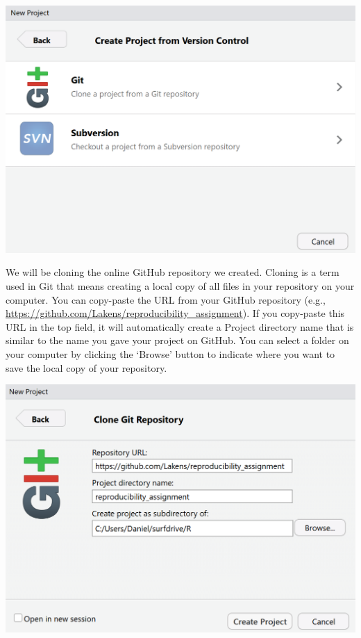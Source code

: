 \documentclass[
  oneside]{book}
\begin{document}
\begin{center}\includegraphics[width=1\linewidth]{images/a37a25fa7b6b9534d8f16154ce417be6} \end{center}

We will be cloning the online GitHub repository we created. Cloning is a term
used in Git that means creating a local copy of all files in your repository on
your computer. You can copy-paste the URL from your GitHub repository (e.g.,
\url{https://github.com/Lakens/reproducibility_assignment}). If you copy-paste this
URL in the top field, it will automatically create a Project directory name that
is similar to the name you gave your project on GitHub. You can select a folder
on your computer by clicking the `Browse' button to indicate where you want to
save the local copy of your repository.

\begin{center}\includegraphics[width=1\linewidth]{images/085ad47bd94f834aca501b87baa7c0eb} \end{center}
\end{document}
